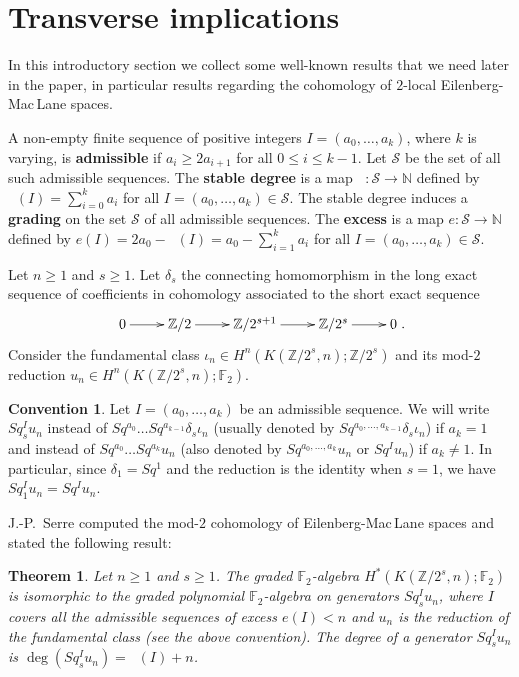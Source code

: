 \documentclass{conm-p-l}
\newtheorem{thm}{Theorem}[section]
\theoremstyle{definition}
\newtheorem*{conv*}{Convention}
\DeclareMathOperator{\degst}{deg_{st}}
\newcommand{\N}{\mathbb{N}}
\newcommand{\Z}{\mathbb{Z}}
\newcommand{\F}{\mathbb{F}}
\renewcommand{\geq}{\geqslant}
\renewcommand{\leq}{\leqslant}
\begin{document}
\section{Transverse implications}\label{s:transverse}

In this introductory section we collect some well-known results that we need later in the paper, in particular results regarding the cohomology of $2$-local Eilenberg-Mac\,Lane spaces.

A non-empty finite sequence of positive integers $I=(a_0,\dots,a_k)$, where $k$ is varying, is {\bf admissible} if $a_i\geq2a_{i+1}$ for all $0\leq i\leq k-1$. Let $\mathcal S$ be the set of all such admissible sequences. The {\bf stable degree} is a map $\degst:{\mathcal S}\to\N$ defined by $\degst(I)=\sum_{i=0}^k a_i$ for all $I=(a_0,\dots,a_k)\in{\mathcal S}$. The stable degree induces a {\bf grading} on the set $\mathcal S$ of all admissible sequences. The {\bf excess} is a map $e:{\mathcal S}\to\N$ defined by $e(I)=2a_0-\degst(I)=a_0-\sum_{i=1}^k a_i$ for all $I=(a_0,\dots,a_k)\in{\mathcal S}$.

Let $n\geq1$ and $s\geq1$. Let $\delta_s$ the connecting homomorphism in the long exact sequence of coefficients in cohomology associated to the short exact sequence
$$\xymatrix{0\ar[r] &\Z/2\ar[r] &\Z/2^{s+1}\ar[r] &\Z/2^s\ar[r] &0}.$$ 
Consider the fundamental class $\iota_n\in H^n(K(\Z/2^s,n);\Z/2^s)$ and its mod-$2$ reduction $u_n\in H^n(K(\Z/2^s,n);\F_2)$. 
\begin{conv*}
Let $I=(a_0,\dots,a_k)$ be an admissible sequence. We will write $Sq^I_s u_n$ instead of $Sq^{a_0}\dots Sq^{a_{k-1}}\delta_s\iota_n$ (usually denoted by $Sq^{a_0,\dots,a_{k-1}}\delta_s\iota_n$) if $a_k=1$ and instead of $Sq^{a_0}\dots Sq^{a_k} u_n$ (also denoted by $Sq^{a_0,\dots,a_k} u_n$ or $Sq^I u_n$) if $a_k\not=1$. In particular, since $\delta_1=Sq^1$ and the reduction is the identity when $s=1$, we have $Sq^I_1 u_n=Sq^I u_n$.
\end{conv*}

J.-P.~Serre \cite{Se53} computed the mod-$2$ cohomology of Eilenberg-Mac\,Lane spaces and stated the following result:

\begin{thm}
Let $n\geq1$ and $s\geq1$. The graded $\F_2$-algebra $H^*(K(\Z/2^s,n);\F_2)$ is isomorphic to the graded polynomial $\F_2$-algebra on generators $Sq^I_s u_n$, where $I$ covers all the admissible sequences of excess $e(I)<n$ and $u_n$ is the reduction of the fundamental class (see the above convention). The degree of a generator $Sq^I_s u_n$ is $\deg(Sq^I_s u_n)=\degst(I)+n$. 
\end{thm}
\end{document}
